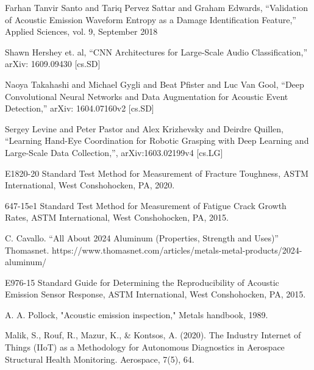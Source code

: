 \documentclass[conference]{IEEEtran}
\begin{document}
\begin{thebibliography}{00}
 Farhan Tanvir Santo and Tariq Pervez Sattar and Graham Edwards, ``Validation of Acoustic Emission Waveform Entropy as a Damage Identification Feature,'' Applied Sciences, vol. 9, September 2018

 Shawn Hershey et. al, ``CNN Architectures for Large-Scale Audio Classification,'' arXiv: 1609.09430 [cs.SD]

 Naoya Takahashi and Michael Gygli and Beat Pfister and Luc Van Gool, ``Deep Convolutional Neural Networks and Data Augmentation for Acoustic Event Detection,'' arXiv: 1604.07160v2 [cs.SD]

 Sergey Levine and Peter Pastor and Alex Krizhevsky and Deirdre Quillen, ``Learning Hand-Eye Coordination for Robotic Grasping with Deep Learning and Large-Scale Data Collection,'', arXiv:1603.02199v4 [cs.LG]

 E1820-20 Standard Test Method for Measurement of Fracture Toughness, ASTM International, West Conshohocken, PA, 2020. 

 647-15e1 Standard Test Method for Measurement of Fatigue Crack Growth Rates, ASTM International, West Conshohocken, PA, 2015. 

 C. Cavallo. ``All About 2024 Aluminum (Properties, Strength and Uses)'' Thomasnet. https://www.thomasnet.com/articles/metals-metal-products/2024-aluminum/

 E976-15 Standard Guide for Determining the Reproducibility of Acoustic Emission Sensor Response, ASTM International, West Conshohocken, PA, 2015. 

 A. A. Pollock, "Acoustic emission inspection," Metals handbook, 1989.

 Malik, S., Rouf, R., Mazur, K., \& Kontsos, A. (2020). The Industry Internet of Things (IIoT) as a Methodology for Autonomous Diagnostics in Aerospace Structural Health Monitoring. Aerospace, 7(5), 64.

\end{thebibliography}
\vspace{12pt}
\end{document}
